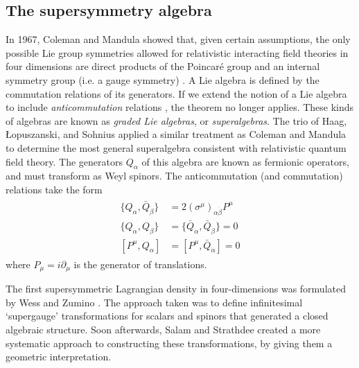 \subsection{The supersymmetry algebra}
In 1967, Coleman and Mandula \citep{Coleman1967} showed that, given certain assumptions, the only possible Lie group symmetries allowed for relativistic interacting field theories in four dimensions are direct products of the Poincar\'e group and an internal symmetry group (i.e. a gauge symmetry) \citep{Mandula2015}.
A Lie algebra is defined by the commutation relations of its generators. If we extend the notion of a Lie algebra to include \emph{anticommutation} relations \citep{Wess1992}, the theorem no longer applies. These kinds of algebras are known as \emph{graded Lie algebras}, or \emph{superalgebras}. The trio of Haag, Łopuszanski, and Sohnius \citep{Haag1975} applied a similar treatment as Coleman and Mandula to determine the most general superalgebra consistent with relativistic quantum field theory. The generators $Q_\alpha$ of this algebra are known as fermionic operators, and must transform as Weyl spinors. The anticommutation (and commutation) relations take the form
\begin{align}
  \begin{split}
  \{Q_\alpha, \bar{Q}_{\dot{\beta}}\} &= 2(\sigma^\mu)_{\alpha\dot{\beta}}P^\mu\\
  \{Q_\alpha, Q_\beta\} &= \{\bar{Q}_{\dot{\alpha}}, \bar{Q}_{\dot{\beta}}\} = 0\\
  [P^\mu,Q_\alpha] &= [P^\mu,\bar{Q}_{\dot{\alpha}}] = 0
\end{split}
\label{eq:susy_algebra}
\end{align}
where $P_\mu = i\partial_\mu$ is the generator of translations. 

The first supersymmetric Lagrangian density in four-dimensions was formulated by Wess and Zumino \citep{Wess1974}. The approach taken was to define infinitesimal `supergauge' transformations for scalars and spinors that generated a closed algebraic structure. Soon afterwards, Salam and Strathdee \citep{Salam1974} created a more systematic approach to constructing these transformations, by giving them a geometric interpretation. 

